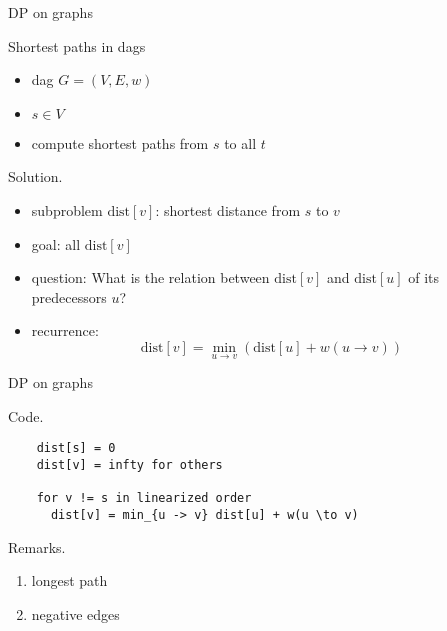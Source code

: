 \begin{frame}{DP on graphs}
  \begin{exampleblock}{Shortest paths in dags}
    \begin{itemize}
      \item dag $G = (V, E, w)$
      \item $s \in V$
      \item compute shortest paths from $s$ to all $t$
    \end{itemize}
  \end{exampleblock}

  \begin{block}{Solution.}
    \begin{itemize}
      \item subproblem $\text{dist}[v]$: shortest distance from $s$ to $v$ 
      \item goal: all $\text{dist}[v]$
      \item question: What is the relation between $\text{dist}[v]$ and $\text{dist}[u]$ of its predecessors $u$?
      \item recurrence:
	\[
	  \text{dist}[v] = \min_{u \to v} \left(\text{dist}[u] + w(u \to v)\right) 
	\]
    \end{itemize}
  \end{block}
\end{frame}
\begin{frame}[fragile]{DP on graphs}
  \begin{block}{Code.}
    \begin{verbatim}
    dist[s] = 0
    dist[v] = infty for others

    for v != s in linearized order
      dist[v] = min_{u -> v} dist[u] + w(u \to v)
    \end{verbatim}
  \end{block}

  \begin{alertblock}{Remarks.}
    \begin{enumerate}
      \item longest path
      \item negative edges
    \end{enumerate}
  \end{alertblock}
\end{frame}

